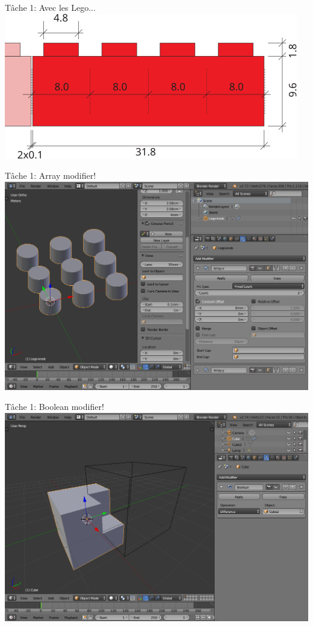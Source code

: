 \documentclass[compress]{beamer}
\begin{document}

\begin{frame}{Tâche 1: Avec les Lego...}
         \centering
        \includegraphics[width=0.9\linewidth]{lego}
\end{frame}

\begin{frame}{Tâche 1: Array modifier!}
         \centering
        \includegraphics[width=0.9\linewidth]{array}
\end{frame}

\begin{frame}{Tâche 1: Boolean modifier!}
         \centering
        \includegraphics[width=0.9\linewidth]{boolean}
\end{frame}
\end{document}
